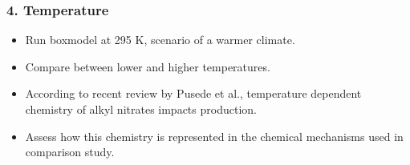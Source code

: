 \begin{frame}
    \frametitle{4. Temperature}

    \vspace{-5mm}
    \begin{itemize}
        \item Run boxmodel at 295 K, scenario of a warmer climate. \vspace{3mm}
        \item Compare  between lower and higher temperatures. \vspace{3mm}
        \item According to recent review by Pusede et al., temperature dependent chemistry of alkyl nitrates impacts  production. \vspace{3mm}
        \item Assess how this chemistry is represented in the chemical mechanisms used in comparison study. 
    \end{itemize}
\end{frame}
